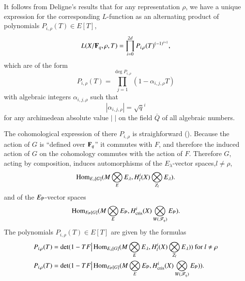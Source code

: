 It follows from Deligne's results that for any representation $\rho$, we have a unique expression for the corresponding $L$-function as an alternating product of polynomials $P_{i,\rho}(T) \in E [T]$,
$$
L(X/ \mathbf{F}_{q}, \rho, T) =\prod\limits^{2d}_{i=0} P_{i,\rho} (T)^{(-1)^{i+1}},
$$
which are of the form 
$$
P_{i,\rho} (T) = \prod\limits^{\deg P_{i,\rho}}_{j=1} (1 - \alpha_{i, j, \rho} T)
$$
with algebraic integers $\alpha_{i, j,\rho}$ such that 
$$
|\alpha_{i, j, \rho}| = \sqrt{q}^i
$$
for any archimedean absolute value $|\;|$ on the field $\bar{Q}$ of all algebraic numbers. 

The cohomological expression of there $P_{i,\rho}$ is straighforward  (\cf\cite{art6-key18}). Because the action of $G$ is ``defined over $\mathbf{F}_q$'' it commutes with $F$, and therefore the induced action of $G$ on the cohomology commutes with the action of $F$. Therefore $G$, acting by composition, induces automorphisms of the $E_\lambda$-vector spaces,$l \neq \rho$,
$$
\operatorname{Hom}_{E_\lambda [G]} (M\bigotimes\limits_E E_\lambda, H^i_l (X) \bigotimes\limits_{Z_l} E_\lambda).
$$
and of the $E_{\mathsf{P}}$-vector spaces
$$
\operatorname{Hom}_{E_{\mathsf{P}} [G]} (M \bigotimes\limits_{E} E_{\mathsf{P}}, H^i_{\text{cris}} (X) \bigotimes\limits_{W(\mathscr{F}_q)} E_{\mathsf{P}}). 
$$
The polynomials $P_{i, \rho} (T) \in E [T]$ are given by the formulas 
\begin{align*}
P_{i,\rho} (T) & = \det (1 - T F \big| \operatorname{Hom}_{E_\lambda [G]} (M \bigotimes\limits_{E} E_\lambda, H^i_l (X) \bigotimes\limits_{Z_l} E_\lambda )) \text{ for } l \neq \rho \\
P_{i, \rho} (T) & = \det (1 - TF \big| \operatorname{Hom}_{E_{\mathsf{P}} [G]} (M\bigotimes\limits_E E_{\mathsf{P}}, H^i_{\text{cris}} (X) \bigotimes\limits_{W (\mathscr{F}_q)} E_{\mathsf{P}})).
\end{align*}

